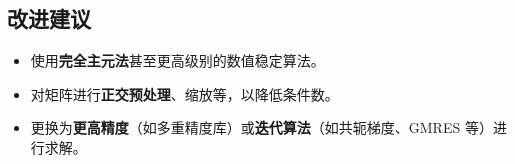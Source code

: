 \documentclass[UTF8]{ctexart}
\begin{document}
\subsection{改进建议}
\begin{itemize}
\item 使用\textbf{完全主元法}甚至更高级别的数值稳定算法。
\item 对矩阵进行\textbf{正交预处理}、缩放等，以降低条件数。
\item 更换为\textbf{更高精度}（如多重精度库）或\textbf{迭代算法}（如共轭梯度、GMRES 等）进行求解。
\end{itemize}
\end{document}
